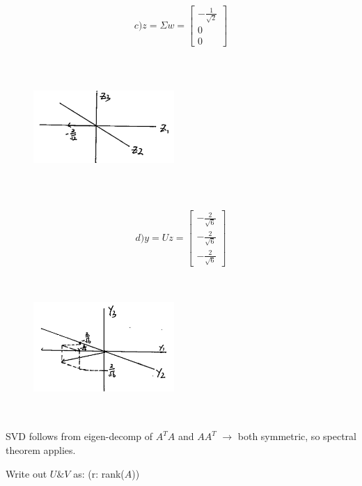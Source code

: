 \begin{example}
\begin{figure}
	\end{figure}
	$$ c) z = \Sigma w = 
	\left[
	\begin{matrix}
	-\frac{1}{\sqrt{2}}\\
	0\\
	0
	\end{matrix}
	\right]
	$$
	\begin{figure}
		\centering
		\includegraphics[width=2.1in,height=2.1in]{figures/ch05/figure1_c.png}
	\end{figure}
	$$ d) y = Uz =  
	\left[
	\begin{matrix}
	-\frac{2}{\sqrt{6}}\\
	-\frac{2}{\sqrt{6}}\\
	-\frac{2}{\sqrt{6}}
	\end{matrix}
	\right]
	$$
	\begin{figure}
		\centering
		\includegraphics[width=2.1in,height=2.1in]{figures/ch05/figure1_d.jpg}
	\end{figure}
	
	
\end{example}


SVD follows from eigen-decomp of $A^TA$ and $AA^T$ $\rightarrow$ both symmetric, so spectral theorem applies. 

Write out $U\& V$ as: (r: rank($A$))



